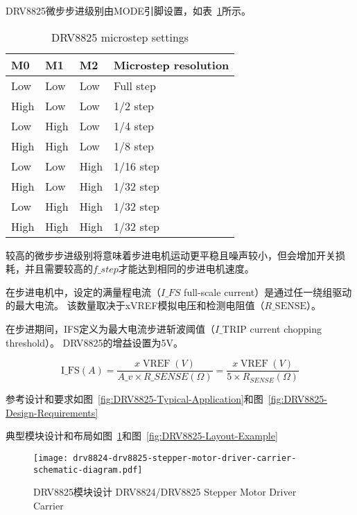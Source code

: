 DRV8825微步步进级别由MODE引脚设置，如表~\ref{tab:DRV8825-microstep-settings}所示。

\begin{table}[htbp]
    \centering
    \begin{tabular}{llll}
    \hline
    M0   & M1   & M2   & Microstep resolution \\ \hline
    Low  & Low  & Low  & Full step            \\ \hline
    High & Low  & Low  & 1/2 step             \\ \hline
    Low  & High & Low  & 1/4 step             \\ \hline
    High & High & Low  & 1/8 step             \\ \hline
    Low  & Low  & High & 1/16 step            \\ \hline
    High & Low  & High & 1/32 step            \\ \hline
    Low  & High & High & 1/32 step            \\ \hline
    High & High & High & 1/32 step            \\ \hline
    \end{tabular}
    \caption{DRV8825 microstep settings}
    \label{tab:DRV8825-microstep-settings}
\end{table}

较高的微步步进级别将意味着步进电机运动更平稳且噪声较小，但会增加开关损耗，并且需要较高的$f\_step$才能达到相同的步进电机速度。

在步进电机中，设定的满量程电流（$I\_{FS}$ full-scale current）是通过任一绕组驱动的最大电流。 该数量取决于xVREF模拟电压和检测电阻值（$R\_{\text {SENSE}}$）。 

在步进期间，IFS定义为最大电流步进斩波阈值（$I\_{\text {TRIP}}$ current chopping threshold）。 DRV8825的增益设置为5V。

\begin{equation}
    \operatorname{I\_{FS}}(A)=\frac{x \operatorname{VREF}(V)}{A\_{v} \times R\_{S E N S E}(\Omega)}=\frac{x \operatorname{VREF}(V)}{5 \times R_{S E N S E}(\Omega)}
\end{equation}

参考设计和要求如图~\ref{fig:DRV8825-Typical-Application}和图~\ref{fig:DRV8825-Design-Requirements}

典型模块设计和布局如图~\ref{fig:DRV8825-stepper-motor-driver-carrier-schematic-diagram}和图~\ref{fig:DRV8825-Layout-Example}

\begin{figure}[htbp]
    \centering
    \texttt{[image: drv8824-drv8825-stepper-motor-driver-carrier-schematic-diagram.pdf]}
    \caption{DRV8825模块设计 DRV8824/DRV8825 Stepper Motor Driver Carrier}
    \label{fig:DRV8825-stepper-motor-driver-carrier-schematic-diagram}
\end{figure}

